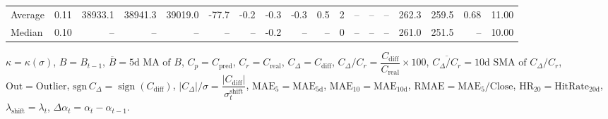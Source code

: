 \begin{threeparttable}
{\begin{tabular}{lrrrrrrrrrrrrrrrrr}
Average &     0.11 & 38933.1 & 38941.3 & 39019.0 &      -77.7 &           -0.2 &                      -0.3 &                     -0.3 &                 0.5 &              2 &         -- &        -- &             -- &            262.3 &               259.5 &            0.68 &                  11.00 \\
 Median &     0.10 &      -- &      -- &      -- &         -- &             -- &                      -0.2 &                       -- &                  -- &              0 &         -- &        -- &             -- &            261.0 &               251.5 &              -- &                  10.00 \\
\bottomrule
\end{tabular}
}
\begin{tablenotes}\footnotesize
\item $\kappa=\kappa(\sigma)$, $B=B_{t-1}$, $\overline{B}=\text{5d MA of }B$, $C_p=C_{\text{pred}}$, $C_r=C_{\text{real}}$, $C_\Delta=C_{\text{diff}}$, $C_\Delta/C_r=\dfrac{C_{\text{diff}}}{C_{\text{real}}}\times100$, $\overline{C_\Delta/C_r}=\text{10d SMA of }C_\Delta/C_r$, $\mathrm{Out}=\text{Outlier}$, $\mathrm{sgn}\,C_\Delta=\operatorname{sign}(C_{\text{diff}})$, $|C_\Delta|/\sigma=\dfrac{|C_{\text{diff}}|}{\sigma_t^{\text{shift}}}$, $\mathrm{MAE}_5=\mathrm{MAE}_{5\text{d}}$, $\mathrm{MAE}_{10}=\mathrm{MAE}_{10\text{d}}$, $\mathrm{RMAE}= \mathrm{MAE}_5 / \text{Close}$, $\mathrm{HR}_{20}=\mathrm{HitRate}_{20\text{d}}$, $\lambda_{\text{shift}}=\lambda_t$, $\Delta\alpha_t=\alpha_t-\alpha_{t-1}$.
\end{tablenotes}
\end{threeparttable}
\endgroup

